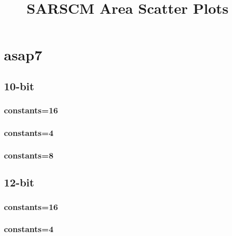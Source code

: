 \documentclass{article}
\begin{document}
\title{SARSCM Area Scatter Plots}
\date{}
\maketitle
\section*{asap7}
\subsection*{10-bit}
\subsubsection*{constants=16}
\begin{figure}[H]
\centering
\resizebox{0.95\linewidth}{!}{}
\end{figure}
\subsubsection*{constants=4}
\begin{figure}[H]
\centering
\resizebox{0.95\linewidth}{!}{}
\end{figure}
\subsubsection*{constants=8}
\begin{figure}[H]
\centering
\resizebox{0.95\linewidth}{!}{}
\end{figure}
\subsection*{12-bit}
\subsubsection*{constants=16}
\begin{figure}[H]
\centering
\resizebox{0.95\linewidth}{!}{}
\end{figure}
\subsubsection*{constants=4}
\begin{figure}[H]
\centering
\resizebox{0.95\linewidth}{!}{}
\end{figure}
\end{document}
